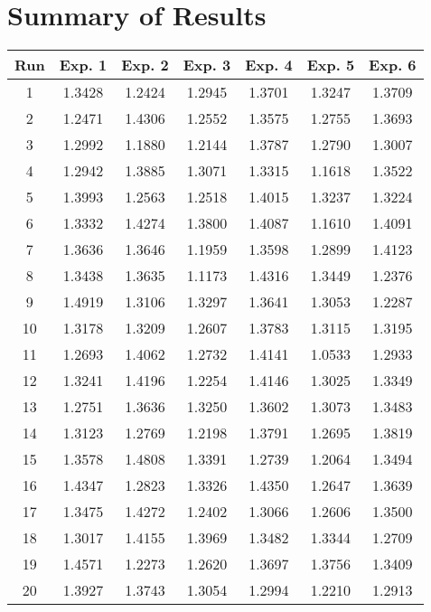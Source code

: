 \chapter{Summary of Results}
\label{appendix-summary}

\begin{table}
	\centering
	\begin{tabular}{ | c | c | c | c | c | c | c | }
		\hline
		Run & Exp. 1 & Exp. 2 & Exp. 3 & Exp. 4 & Exp. 5 & Exp. 6 \\ \hline
		1 & 1.3428 & 1.2424 & 1.2945 & 1.3701 & 1.3247 & 1.3709 \\ \hline
		2 & 1.2471 & 1.4306 & 1.2552 & 1.3575 & 1.2755 & 1.3693 \\ \hline
		3 & 1.2992 & 1.1880 & 1.2144 & 1.3787 & 1.2790 & 1.3007 \\ \hline
		4 & 1.2942 & 1.3885 & 1.3071 & 1.3315 & 1.1618 & 1.3522 \\ \hline
		5 & 1.3993 & 1.2563 & 1.2518 & 1.4015 & 1.3237 & 1.3224 \\ \hline
		6 & 1.3332 & 1.4274 & 1.3800 & 1.4087 & 1.1610 & 1.4091 \\ \hline
		7 & 1.3636 & 1.3646 & 1.1959 & 1.3598 & 1.2899 & 1.4123 \\ \hline
		8 & 1.3438 & 1.3635 & 1.1173 & 1.4316 & 1.3449 & 1.2376 \\ \hline
		9 & 1.4919 & 1.3106 & 1.3297 & 1.3641 & 1.3053 & 1.2287 \\ \hline
		10 & 1.3178 & 1.3209 & 1.2607 & 1.3783 & 1.3115 & 1.3195 \\ \hline
		11 & 1.2693 & 1.4062 & 1.2732 & 1.4141 & 1.0533 & 1.2933 \\ \hline
		12 & 1.3241 & 1.4196 & 1.2254 & 1.4146 & 1.3025 & 1.3349 \\ \hline
		13 & 1.2751 & 1.3636 & 1.3250 & 1.3602 & 1.3073 & 1.3483 \\ \hline
		14 & 1.3123 & 1.2769 & 1.2198 & 1.3791 & 1.2695 & 1.3819 \\ \hline
		15 & 1.3578 & 1.4808 & 1.3391 & 1.2739 & 1.2064 & 1.3494 \\ \hline
		16 & 1.4347 & 1.2823 & 1.3326 & 1.4350 & 1.2647 & 1.3639 \\ \hline
		17 & 1.3475 & 1.4272 & 1.2402 & 1.3066 & 1.2606 & 1.3500 \\ \hline
		18 & 1.3017 & 1.4155 & 1.3969 & 1.3482 & 1.3344 & 1.2709 \\ \hline
		19 & 1.4571 & 1.2273 & 1.2620 & 1.3697 & 1.3756 & 1.3409 \\ \hline
		20 & 1.3927 & 1.3743 & 1.3054 & 1.2994 & 1.2210 & 1.2913 \\ \hline

\end{tabular}
\end{table}
